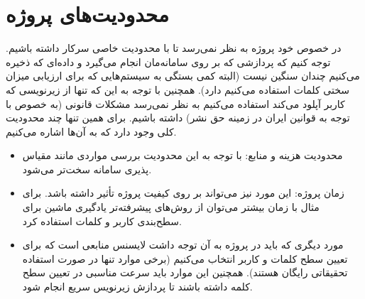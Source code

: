 \section{محدودیت‌های پروژه}
در خصوص خود پروژه به نظر نمی‌رسد تا با محدودیت خاصی سرکار داشته باشیم. توجه کنیم که پردازشی که بر روی سامانه‌مان انجام می‌گیرد و داده‌ای که ذخیره می‌کنیم چندان سنگین نیست (البته کمی بستگی به سیستم‌هایی که برای ارزیابی میزان سختی کلمات استفاده  می‌کنیم دارد). همچنین با توجه به این که تنها از زیرنویسی که کاربر  آپلود می‌کند استفاده می‌کنیم به نظر نمی‌رسد مشکلات قانونی (به خصوص با توجه به قوانین  ایران در زمینه حق نشر)‌ داشته باشیم. برای همین تنها چند محدودیت کلی وجود دارد که به آن‌ها اشاره می‌کنیم.
\begin{itemize}
	\item محدودیت هزینه و منابع: با توجه به این محدودیت بررسی مواردی مانند مقیاس پذیری سامانه سخت‌تر می‌شود.
	\item زمان پروژه: این مورد نیز می‌تواند بر روی کیفیت پروژه تأثیر داشته باشد. برای مثال با زمان بیشتر می‌توان از روش‌های پیشرفته‌تر یادگیری ماشین برای سطح‌بندی کاربر و کلمات استفاده کرد.
	\item مورد دیگری که باید در پروژه به آن توجه داشت لایسنس‌ منابعی است که برای تعیین سطح کلمات و کاربر انتخاب می‌کنیم (برخی موارد تنها در صورت استفاده تحقیقاتی رایگان هستند). همچنین این موارد باید سرعت مناسبی در تعیین سطح کلمه داشته باشند تا پردازش زیرنویس سریع انجام شود.
\end{itemize} 